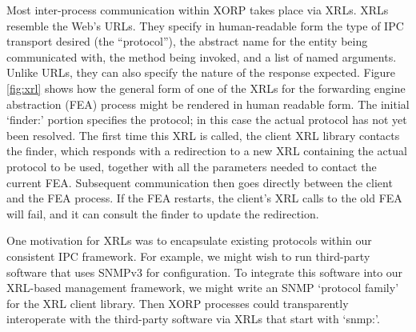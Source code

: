 \def\xrl#1{\textsf{\small #1}} Most inter-process communication within
XORP takes place via XRLs.  XRLs resemble the Web's URLs. They specify
in human-readable form the type of IPC transport desired (the
``protocol''), the abstract name for the entity being communicated
with, the method being invoked, and a list of named arguments.  Unlike
URLs, they can also specify the nature of the response expected.
Figure \ref{fig:xrl} shows how the general form of one of the XRLs for
the forwarding engine abstraction (FEA) process might be rendered in
human readable form. The initial `\xrl{finder:}' portion specifies the
protocol; in this case the actual protocol has not yet been resolved.
The first time this XRL is called, the client XRL library contacts the
finder, which responds with a redirection to a new XRL containing the
actual protocol to be used, together with all the parameters needed to
contact the current FEA.  Subsequent communication then goes directly
between the client and the FEA process.  If the FEA restarts, the
client's XRL calls to the old FEA will fail, and it can consult the
finder to update the redirection.


One motivation for XRLs was to encapsulate existing
protocols within our consistent IPC framework.   For example, we
might wish to run third-party software that uses SNMPv3 for
configuration. 
To integrate this software into our XRL-based management framework, we
might write an SNMP `protocol family' for the XRL client library.
Then XORP processes could transparently interoperate with the third-party
software via XRLs that start with `\xrl{snmp:}'.

